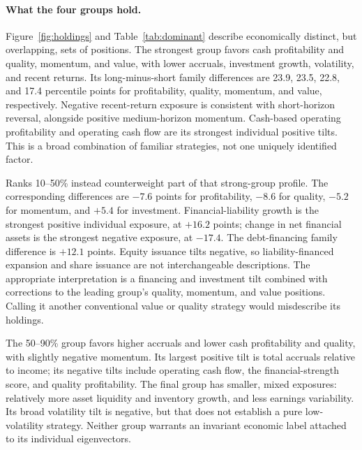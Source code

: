 \paragraph{What the four groups hold.}
Figure~\ref{fig:holdings} and Table~\ref{tab:dominant} describe economically distinct, but overlapping, sets of positions. The strongest group favors cash profitability and quality, momentum, and value, with lower accruals, investment growth, volatility, and recent returns. Its long-minus-short family differences are 23.9, 23.5, 22.8, and 17.4 percentile points for profitability, quality, momentum, and value, respectively. Negative recent-return exposure is consistent with short-horizon reversal, alongside positive medium-horizon momentum. Cash-based operating profitability and operating cash flow are its strongest individual positive tilts. This is a broad combination of familiar strategies, not one uniquely identified factor.

Ranks 10--50\% instead counterweight part of that strong-group profile. The corresponding differences are $-7.6$ points for profitability, $-8.6$ for quality, $-5.2$ for momentum, and $+5.4$ for investment. Financial-liability growth is the strongest positive individual exposure, at $+16.2$ points; change in net financial assets is the strongest negative exposure, at $-17.4$. The debt-financing family difference is $+12.1$ points. Equity issuance tilts negative, so liability-financed expansion and share issuance are not interchangeable descriptions. The appropriate interpretation is a financing and investment tilt combined with corrections to the leading group's quality, momentum, and value positions. Calling it another conventional value or quality strategy would misdescribe its holdings.

The 50--90\% group favors higher accruals and lower cash profitability and quality, with slightly negative momentum. Its largest positive tilt is total accruals relative to income; its negative tilts include operating cash flow, the financial-strength score, and quality profitability. The final group has smaller, mixed exposures: relatively more asset liquidity and inventory growth, and less earnings variability. Its broad volatility tilt is negative, but that does not establish a pure low-volatility strategy. Neither group warrants an invariant economic label attached to its individual eigenvectors.



